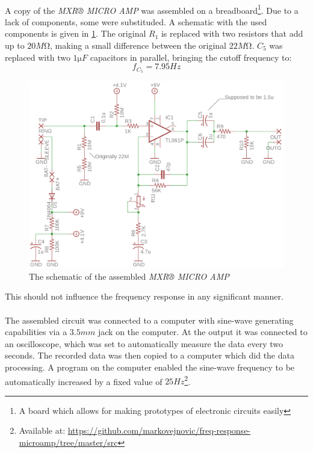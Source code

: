 \documentclass[a4paper, 12pt]{article}
\begin{document}
\paragraph*{}
A copy of the \textit{MXR® MICRO AMP} was assembled on a 
breadboard\footnote{A board which allows for making prototypes of electronic 
circuits easily}. Due to a lack of components, some were substituded. A 
schematic with the used components is given in \ref{fig:mxr-microamp-used}. 
The original $R_1$ is replaced with two resistors that add up to 
$20\si{M\ohm}$, making a small difference between the original $22\si{M\ohm}$. 
$C_5$ was replaced with two $1\si{\micro F}$ capacitors in parallel, bringing 
the cutoff frequency to:
$$f_{C_5} = 7.95 \si{Hz}$$
\begin{figure}[ht]
	\centering
	\includegraphics{img/mxr-microamp-used}
	\caption{The schematic of the assembled \textit{MXR® MICRO AMP}}
	\label{fig:mxr-microamp-used}
\end{figure}
This should not influence the frequency response in any significant manner.

\paragraph*{}
The assembled circuit was connected to a computer with sine-wave generating 
capabilities via a $3.5\si{mm}$ jack on the computer. At the output it was 
connected to an oscilloscope, which was set 
to automatically measure the data every two seconds. The recorded data was 
then copied to a computer which did the data processing. A program on the 
computer enabled the sine-wave frequency to be automatically increased by a 
fixed value of $25Hz$\footnote{Available at: 
\url{https://github.com/markovejnovic/freq-response-microamp/tree/master/src}}.
\end{document}
